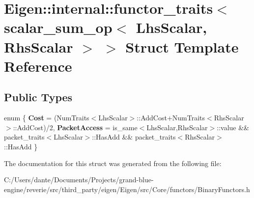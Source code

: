 \hypertarget{struct_eigen_1_1internal_1_1functor__traits_3_01scalar__sum__op_3_01_lhs_scalar_00_01_rhs_scalar_01_4_01_4}{}\section{Eigen\+::internal\+::functor\+\_\+traits$<$ scalar\+\_\+sum\+\_\+op$<$ Lhs\+Scalar, Rhs\+Scalar $>$ $>$ Struct Template Reference}
\label{struct_eigen_1_1internal_1_1functor__traits_3_01scalar__sum__op_3_01_lhs_scalar_00_01_rhs_scalar_01_4_01_4}
\subsection*{Public Types}
\begin{DoxyCompactItemize}
\item 
\mbox{\label{struct_eigen_1_1internal_1_1functor__traits_3_01scalar__sum__op_3_01_lhs_scalar_00_01_rhs_scalar_01_4_01_4_a3b81d307037509af8d222d1fe27186ff}} 
enum \{ {\bfseries Cost} = (Num\+Traits$<$Lhs\+Scalar$>$\+::Add\+Cost+\+Num\+Traits$<$Rhs\+Scalar$>$\+::Add\+Cost)/2, 
{\bfseries Packet\+Access} = is\+\_\+same$<$Lhs\+Scalar,Rhs\+Scalar$>$\+::value \&\& packet\+\_\+traits$<$Lhs\+Scalar$>$\+::Has\+Add \&\& packet\+\_\+traits$<$Rhs\+Scalar$>$\+::Has\+Add
 \}
\end{DoxyCompactItemize}


The documentation for this struct was generated from the following file\+:\begin{DoxyCompactItemize}
\item 
C\+:/\+Users/dante/\+Documents/\+Projects/grand-\/blue-\/engine/reverie/src/third\+\_\+party/eigen/\+Eigen/src/\+Core/functors/Binary\+Functors.\+h\end{DoxyCompactItemize}
